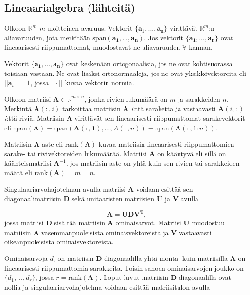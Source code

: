 \subsection{Lineaarialgebra (lähteitä)}
Olkoon $\mathbb{R}^m$ \textit{m}-uloitteinen avaruus. Vektorit $\{\mathbf{a_1,...,a_n}\}$ virittävät $\mathbb{R}^m$:n aliavaruuden, jota merkitään $\text{span}(\mathbf{a_1,...,a_n})$. Jos vektorit $\{\mathbf{a_1,...,a_n}\}$ ovat lineaarisesti riippumattomat, muodostavat ne aliavaruuden $\mathbb{V}$ kannan.

Vektorit $\{\mathbf{a_1,...,a_n}\}$ ovat keskenään ortogonaalisia, jos ne ovat kohtisuorassa toisiaan vastaan. Ne ovat lisäksi ortonormaaleja, jos ne ovat yksikkövektoreita eli $||\mathbf{a}_i||=1$, jossa $||\cdot||$ kuvaa vektorin normia.

Olkoon matriisi $\mathbf{A}\in \mathbb{R}^{m\times n}$, jonka rivien lukumäärä on $\mathit{m}$ ja sarakkeiden $\mathit{n}$. Merkintä $\mathbf{A}(:,i)$ tarkoittaa matriisin \textbf{A} \textit{i}:ttä saraketta ja vastaavasti $\mathbf{A}(i,:)$ \textit{i}:ttä riviä. Matriisin \textbf{A} virittävät sen lineaarisesti riippumattomat sarakevektorit eli $\text{span}(\mathbf{A}) = \text{span}(\mathbf{A(:,1)},...,A(:,n)) = \text{span}(\mathbf{A}(:,1:n))$. 

Matriisin \textbf{A} aste eli $\text{rank}(\textbf{A})$ kuvaa matriisin lineaarisesti riippumattomien sarake- tai rivivektoreiden lukumäärää. Matriisi \textbf{A} on kääntyvä eli sillä on käänteismatriisi $\mathbf{A}^{-1}$, jos matriisin aste on yhtä kuin sen rivien tai sarakkeiden määrä eli $\text{rank}(\textbf{A})=m=n$.

Singulaariarvohajotelman avulla matriisi \textbf{A} voidaan esittää sen diagonaalimatriisin \textbf{D} sekä unitaaristen matriisien \textbf{U} ja \textbf{V} avulla

\begin{equation}
    \mathbf{A = UDV^T,}
    \label{eq:svd}
\end{equation}
jossa matriisi \textbf{D} sisältää matriisin \textbf{A} ominaisarvot. Matriisi \textbf{U} muodostuu matriisin \textbf{A} vasemmanpuoleisista ominaisvektoreista ja \textbf{V} vastaavasti oikeanpuoleisista ominaisvektoreista. 

Ominaisarvoja $d_i$ on matriisin $\mathbf{D}$ diagonaalilla yhtä monta, kuin matriisilla $\mathbf{A}$ on lineaarisesti riippumattomia sarakkeita. Toisin sanoen ominaisarvojen joukko on $\{d_1,...,d_r\}$, jossa $r = \text{rank}(\mathbf{A})$. Loput luvut matriisin \textbf{D} diagonaalilla ovat nollia ja singulaariarvohajotelma voidaan esittää matriisitulon avulla 

